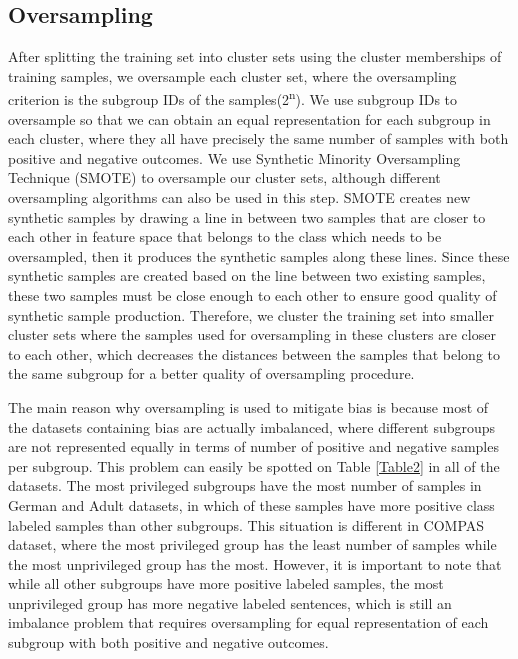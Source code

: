 \subsection{Oversampling}\label{ssec:oversamp}

After splitting the training set into cluster sets using the cluster memberships of training samples, we oversample each cluster set, where the oversampling criterion is the subgroup IDs of the samples(2\textsuperscript{n}). We use subgroup IDs to oversample so that we can obtain an equal representation for each subgroup in each cluster, where they all have precisely the same number of samples with both positive and negative outcomes. We use Synthetic Minority Oversampling Technique (SMOTE) \cite{smote} to oversample our cluster sets, although different oversampling algorithms can also be used in this step. SMOTE creates new synthetic samples by drawing a line in between two samples that are closer to each other in feature space that belongs to the class which needs to be oversampled, then it produces the synthetic samples along these lines. Since these synthetic samples are created based on the line between two existing samples, these two samples must be close enough to each other to ensure good quality of synthetic sample production. Therefore, we cluster the training set into smaller cluster sets where the samples used for oversampling in these clusters are closer to each other, which decreases the distances between the samples that belong to the same subgroup for a better quality of oversampling procedure.

The main reason why oversampling is used to mitigate bias is because most of the datasets containing bias are actually imbalanced, where different subgroups are not represented equally in terms of number of positive and negative samples per subgroup. This problem can easily be spotted on Table \ref{Table2} in all of the datasets. The most privileged subgroups have the most number of samples in German and Adult datasets, in which of these samples have more positive class labeled samples than other subgroups. This situation is different in COMPAS dataset, where the most privileged group has the least number of samples while the most unprivileged group has the most. However, it is important to note that while all other subgroups have more positive labeled samples, the most unprivileged group has more negative labeled sentences, which is still an imbalance problem that requires oversampling for equal representation of each subgroup with both positive and negative outcomes. 

